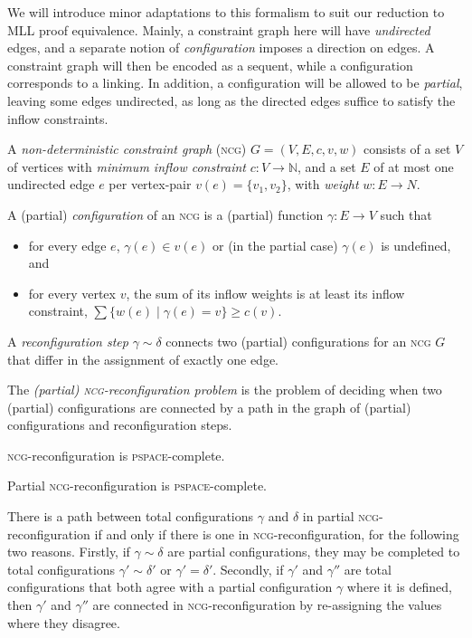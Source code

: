 \documentclass[conference]{IEEEtran}
\begin{document}
We will introduce minor adaptations to this formalism to suit our reduction to MLL proof equivalence.
%
Mainly, a constraint graph here will have \emph{undirected} edges, and a separate notion of \emph{configuration} imposes a direction on edges.
%
A constraint graph will then be encoded as a sequent, while a configuration corresponds to a linking.
%
In addition, a configuration will be allowed to be \emph{partial}, leaving some edges undirected, as long as the directed edges suffice to satisfy the inflow constraints.


\begin{definition} 
A \emph{non-deterministic constraint graph} (\textsc{ncg}) $G=(V,E,c,v,w)$ consists of a set $V$ of vertices with \emph{minimum inflow constraint} $c\colon V\to\mathbb N$, and a set $E$ of at most one undirected edge $e$ per vertex-pair $v(e)=\{v_1,v_2\}$, with \emph{weight} $w\colon E\to N$.

A (partial) \emph{configuration} of an \textsc{ncg} is a (partial) function $\gamma\colon E\to V$ such that
\begin{itemize}
	\item
for every edge $e$, $\gamma(e)\in v(e)$ or (in the partial case) $\gamma(e)$ is undefined, and
	\item
for every vertex $v$, the sum of its inflow weights is at least its inflow constraint, $\sum\{w(e)\mid \gamma(e)=v\}\geq c(v)$.
\end{itemize} 

A \emph{reconfiguration step} $\gamma\sim\delta$ connects two (partial) configurations for an \textsc{ncg} $G$ that differ in the assignment of exactly one edge.

\end{definition}


The \emph{(partial) \textsc{ncg}-reconfiguration problem} is the problem of deciding when two (partial) configurations are connected by a path in the graph of (partial) configurations and reconfiguration steps.

\begin{theorem}
\textsc{ncg}-reconfiguration is \textsc{pspace}-complete.
\end{theorem}

\begin{proposition}
Partial \textsc{ncg}-reconfiguration is \textsc{pspace}-complete.
\end{proposition}

\begin{IEEEproof}
There is a path between total configurations $\gamma$ and $\delta$ in partial \textsc{ncg}-reconfiguration if and only if there is one in \textsc{ncg}-reconfiguration, for the following two reasons.
%
Firstly, if $\gamma\sim\delta$ are partial configurations, they may be completed to total configurations $\gamma'\sim\delta'$ or $\gamma'=\delta'$.
%
Secondly, if $\gamma'$ and $\gamma''$ are total configurations that both agree with a partial configuration $\gamma$ where it is defined, then $\gamma'$ and $\gamma''$ are connected in \textsc{ncg}-reconfiguration by re-assigning the values where they disagree.
%
\end{IEEEproof}
\end{document}
